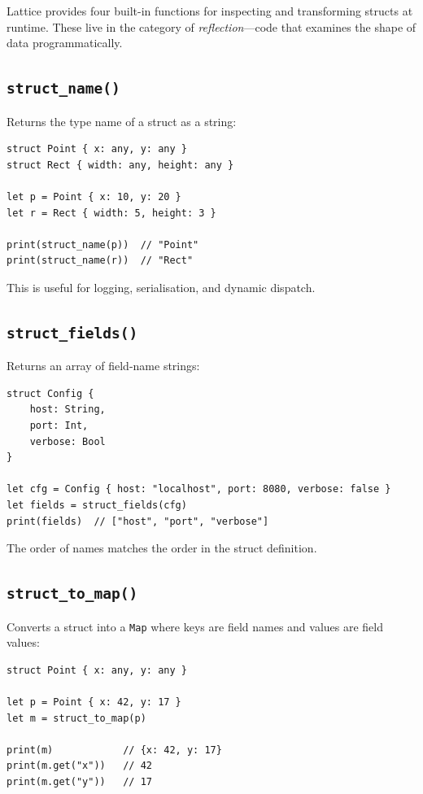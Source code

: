 Lattice provides four built-in functions for inspecting and transforming
structs at runtime. These live in the category of \emph{reflection}---code
that examines the shape of data programmatically.

\subsection{\texttt{struct\_name()}}

Returns the type name of a struct as a string:

\begin{lstlisting}[language=Lattice, caption={Getting a struct's type name}]
struct Point { x: any, y: any }
struct Rect { width: any, height: any }

let p = Point { x: 10, y: 20 }
let r = Rect { width: 5, height: 3 }

print(struct_name(p))  // "Point"
print(struct_name(r))  // "Rect"
\end{lstlisting}

This is useful for logging, serialisation, and dynamic dispatch.

\subsection{\texttt{struct\_fields()}}

Returns an array of field-name strings:

\begin{lstlisting}[language=Lattice, caption={Listing a struct's fields}]
struct Config {
    host: String,
    port: Int,
    verbose: Bool
}

let cfg = Config { host: "localhost", port: 8080, verbose: false }
let fields = struct_fields(cfg)
print(fields)  // ["host", "port", "verbose"]
\end{lstlisting}

The order of names matches the order in the struct definition.

\subsection{\texttt{struct\_to\_map()}}

Converts a struct into a \lstinline|Map| where keys are field names and
values are field values:

\begin{lstlisting}[language=Lattice, caption={Converting a struct to a map}]
struct Point { x: any, y: any }

let p = Point { x: 42, y: 17 }
let m = struct_to_map(p)

print(m)            // {x: 42, y: 17}
print(m.get("x"))   // 42
print(m.get("y"))   // 17
\end{lstlisting}

